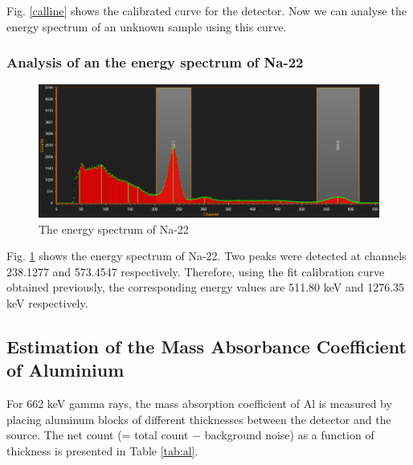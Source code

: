 Fig. \ref{calline} shows the calibrated curve for the detector. Now we can analyse the energy spectrum of an unknown sample using this curve.

\subsubsection*{Analysis of an the energy spectrum of Na-22}

\begin{figure}[H]
    \centering
    \includegraphics[width=1\columnwidth]{images/na22.png}
    \caption{The energy spectrum of Na-22}
    \label{na22}
\end{figure}

Fig. \ref{na22} shows the energy spectrum of Na-22. Two peaks were detected at channels 238.1277 and 573.4547 respectively. Therefore, using the fit calibration curve obtained previously, the corresponding energy values are 511.80 keV and 1276.35 keV respectively.

\subsection{Estimation of the Mass Absorbance Coefficient of Aluminium}

For 662 keV gamma rays, the mass absorption coefficient of Al is measured by placing aluminum blocks of different thicknesses between the detector and the source. The net count (= total count $-$ background noise) as a function of thickness is presented in Table \ref{tab:al}.



